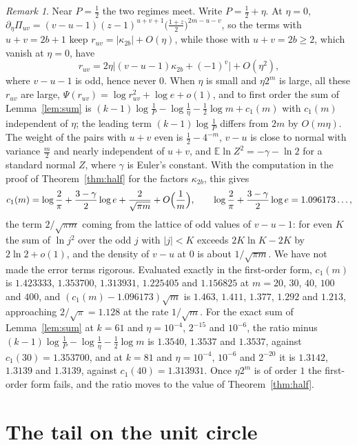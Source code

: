 \documentclass[11pt]{amsart}
\theoremstyle{remark}
\newtheorem{remark}[theorem]{Remark}
\newcommand{\E}{\mathbb{E}}
\begin{document}
\begin{remark}\label{rem:near}
Near $P=\frac12$ the two regimes meet. Write $P=\frac12+\eta$. At $\eta=0$,
$\partial_\eta \Pi_{uv}=(v-u-1)(z-1)^{u+v+1}\bigl(\frac{1+z}2\bigr)^{2m-u-v}$, so the terms with $u+v=2b+1$ keep
$r_{uv}=|\kappa_{2b}|+O(\eta)$, while those with $u+v=2b\ge2$, which vanish at $\eta=0$, have
\[
r_{uv}=2\eta\bigl|(v-u-1)\kappa_{2b}+(-1)^v\bigr|+O(\eta^2),
\]
where $v-u-1$ is odd, hence never $0$. When $\eta$ is small and $\eta2^m$ is large, all these $r_{uv}$ are
large, $\Psi(r_{uv})=\log r_{uv}^2+\log e+o(1)$, and to first order the sum of Lemma~\ref{lem:sum} is
$(k-1)\log\frac1P-\log\frac1\eta-\frac12\log m+c_1(m)$ with $c_1(m)$ independent of $\eta$; the leading term
$(k-1)\log\frac1P$ differs from $2m$ by $O(m\eta)$. The weight of the pairs with $u+v$ even is
$\frac12-4^{-m}$, $v-u$ is close to normal with variance $\frac m2$ and nearly independent of $u+v$, and
$\E\ln Z^2=-\gamma-\ln2$ for a standard normal $Z$, where $\gamma$ is Euler's constant. With the computation in the
proof of Theorem~\ref{thm:half} for the factors $\kappa_{2b}$, this gives
\[
c_1(m)=\log\frac2\pi+\frac{3-\gamma}2\log e+\frac2{\sqrt{\pi m}}+O\Bigl(\frac1m\Bigr),\qquad
\log\frac2\pi+\frac{3-\gamma}2\log e=1.096173\dots,
\]
the term $2/\sqrt{\pi m}$ coming from the lattice of odd values of $v-u-1$: for even $K$ the sum of $\ln j^2$ over the odd $j$ with
$|j|<K$ exceeds $2K\ln K-2K$ by $2\ln2+o(1)$, and the density of $v-u$ at $0$ is about
$1/\sqrt{\pi m}$. We have not made the error terms rigorous. Evaluated
exactly in the first-order form, $c_1(m)$ is $1.423333$, $1.353700$, $1.313931$, $1.225405$ and $1.156825$ at $m=20$,
$30$, $40$, $100$ and $400$, and $(c_1(m)-1.096173)\sqrt m$ is $1.463$, $1.411$, $1.377$, $1.292$ and $1.213$, approaching
$2/\sqrt\pi=1.128$ at the rate $1/\sqrt m$. For the exact sum of Lemma~\ref{lem:sum} at $k=61$ and
$\eta=10^{-4}$, $2^{-15}$ and $10^{-6}$, the ratio minus $(k-1)\log\frac1P-\log\frac1\eta-\frac12\log m$
is $1.3540$, $1.3537$ and $1.3537$, against $c_1(30)=1.353700$, and at $k=81$ and $\eta=10^{-4}$, $10^{-6}$
and $2^{-20}$ it is $1.3142$, $1.3139$ and $1.3139$, against $c_1(40)=1.313931$. Once $\eta2^m$ is of order $1$ the first-order form fails, and the ratio
moves to the value of Theorem~\ref{thm:half}.
\end{remark}

\section{The tail on the unit circle}\label{sec:circle}
\end{document}
